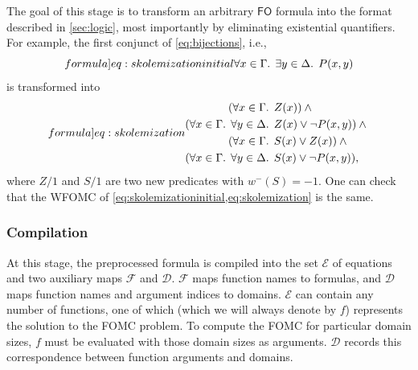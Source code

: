 \documentclass[a4paper,UKenglish,cleveref, autoref, thm-restate]{lipics-v2021}
\newcommand{\FO}{$\mathsf{FO}$}
\begin{document}
The goal of this stage is to transform an arbitrary \FO{} formula into the
format described in \cref{sec:logic}, most importantly by eliminating
existential quantifiers. For example, the first conjunct of
\cref{eq:bijections}, i.e.,
\begin{equation}\label[formula]{eq:skolemizationinitial}
  \forall x \in \Gamma\text{. }\exists y \in \Delta\text{. } P(x, y)
\end{equation}
is transformed into
\begin{equation}\label[formula]{eq:skolemization}
  \begin{aligned}
    (\forall x \in \Gamma\text{. } &Z(x))\land{}\\
    (\forall x \in \Gamma\text{. } \forall y \in \Delta\text{. } &Z(x) \lor \neg P(x, y))\land{}\\
    (\forall x \in \Gamma\text{. } &S(x) \lor Z(x))\land{}\\
    (\forall x \in \Gamma\text{. } \forall y \in \Delta\text{. } &S(x) \lor \neg P(x, y)),
  \end{aligned}
\end{equation}
where $Z/1$ and $S/1$ are two new predicates with $w^{-}(S) = -1$. One can check
that the WFOMC of \cref{eq:skolemizationinitial,eq:skolemization} is the same.

\subsubsection{Compilation}

At this stage, the preprocessed formula is compiled into the set $\mathcal{E}$
of equations and two auxiliary maps $\mathcal{F}$ and $\mathcal{D}$.
$\mathcal{F}$ maps function names to formulas, and $\mathcal{D}$ maps function
names and argument indices to domains. $\mathcal{E}$ can contain any number of
functions, one of which (which we will always denote by $f$) represents the
solution to the FOMC problem. To compute the FOMC for particular domain sizes,
$f$ must be evaluated with those domain sizes as arguments. $\mathcal{D}$
records this correspondence between function arguments and domains.
\end{document}
